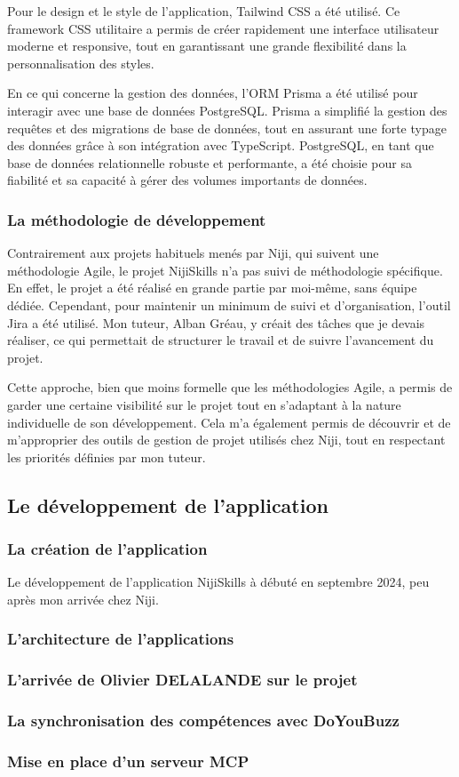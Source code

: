 \documentclass[12pt]{article}
\begin{document}
Pour le design et le style de l'application, Tailwind CSS a été utilisé. Ce framework CSS utilitaire a permis de créer rapidement une interface utilisateur moderne et responsive, tout en garantissant une grande flexibilité dans la personnalisation des styles.

En ce qui concerne la gestion des données, l'ORM Prisma a été utilisé pour interagir avec une base de données PostgreSQL. Prisma a simplifié la gestion des requêtes et des migrations de base de données, tout en assurant une forte typage des données grâce à son intégration avec TypeScript. PostgreSQL, en tant que base de données relationnelle robuste et performante, a été choisie pour sa fiabilité et sa capacité à gérer des volumes importants de données.

\subsubsection{La méthodologie de développement}
Contrairement aux projets habituels menés par Niji, qui suivent une méthodologie Agile, le projet NijiSkills n'a pas suivi de méthodologie spécifique. En effet, le projet a été réalisé en grande partie par moi-même, sans équipe dédiée. Cependant, pour maintenir un minimum de suivi et d'organisation, l'outil Jira a été utilisé. Mon tuteur, Alban Gréau, y créait des tâches que je devais réaliser, ce qui permettait de structurer le travail et de suivre l'avancement du projet.

Cette approche, bien que moins formelle que les méthodologies Agile, a permis de garder une certaine visibilité sur le projet tout en s'adaptant à la nature individuelle de son développement. Cela m'a également permis de découvrir et de m'approprier des outils de gestion de projet utilisés chez Niji, tout en respectant les priorités définies par mon tuteur.

\subsection{Le développement de l'application}
\subsubsection{La création de l'application}
Le développement de l'application NijiSkills à débuté en septembre 2024, peu après mon arrivée chez Niji.
\subsubsection{L'architecture de l'applications}
\subsubsection{L'arrivée de Olivier DELALANDE sur le projet}
\subsubsection{La synchronisation des compétences avec DoYouBuzz}
\subsubsection{Mise en place d'un serveur MCP}
\end{document}
